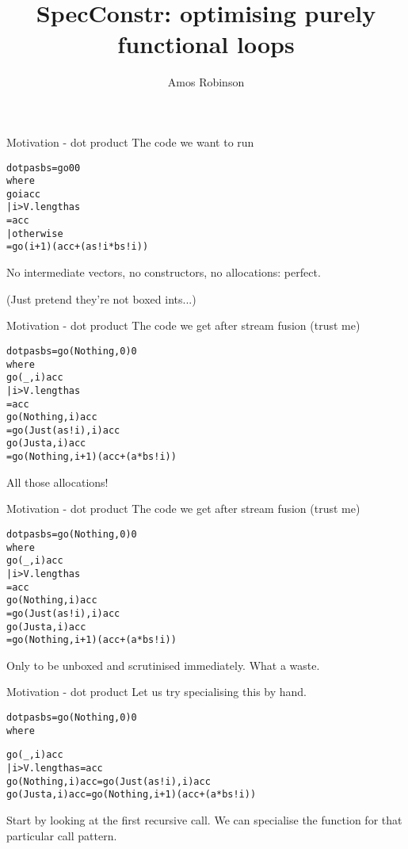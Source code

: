 \documentclass[t]{beamer}
\newcommand{\oomph}[1]{\textcolor[rgb]{0.0,0.5,0.9}{#1}}
\begin{document}
\title{SpecConstr: optimising purely functional loops}
\author{Amos Robinson}

\frame{\titlepage}


\begin{frame}[fragile]{Motivation - dot product}
The code we want to run
\begin{alltt}\Large
dotp as bs = go 0 0
 where
  go i acc
   | i > V.length as
   = acc
   | otherwise
   = go (i + 1) (acc + (as!i * bs!i))
\end{alltt}
No intermediate vectors, no constructors, no allocations: perfect.

(Just pretend they're not boxed ints...)
\end{frame}

\begin{frame}[fragile]{Motivation - dot product}
The code we get after stream fusion (trust me)
\begin{alltt}\Large
dotp as bs = go \oomph{(Nothing,} 0\oomph{)} 0
 where
  go (_, i) acc
   | i > V.length as
   = acc
  go (Nothing, i) acc
   = go (\oomph{Just} (as!i)\oomph{,} i\oomph{)} acc
  go (Just a, i) acc
   = go \oomph{(Nothing,} i + 1\oomph{)} (acc + (a * bs!i))
\end{alltt}
All those allocations!
\end{frame}

\begin{frame}[fragile]{Motivation - dot product}
The code we get after stream fusion (trust me)
\begin{alltt}\Large
dotp as bs = go (Nothing, 0) 0
 where
  go \oomph{(}_\oomph{,} i\oomph{)} acc
   | i > V.length as
   = acc
  go \oomph{(Nothing,} i\oomph{)} acc
   = go (Just (as!i), i) acc
  go \oomph{(Just} a\oomph{,} i\oomph{)} acc
   = go (Nothing, i + 1) (acc + (a * bs!i))
\end{alltt}
Only to be unboxed and scrutinised immediately. What a waste.
\end{frame}

\begin{frame}[fragile]{Motivation - dot product}
Let us try specialising this by hand.
\begin{alltt}
dotp as bs = \oomph{go (Nothing, 0) 0}
 where






  go (_, i) acc
   | i > V.length as  = acc
  go (Nothing, i) acc = go (Just (as!i), i) acc
  go (Just a,  i) acc = go (Nothing, i+1) (acc + (a*bs!i))
\end{alltt}
Start by looking at the first recursive call.
We can specialise the function for that particular call pattern.
\end{frame}
\end{document}
